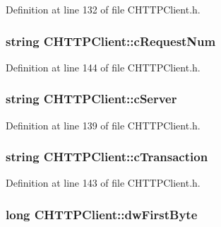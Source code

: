 \-Definition at line 132 of file \-C\-H\-T\-T\-P\-Client.\-h.

\hypertarget{class_c_h_t_t_p_client_aa4092d7fea50e76e30f3269479253db6}{
\subsubsection[{c\-Request\-Num}]{\setlength{\rightskip}{0pt plus 5cm}string {\bf \-C\-H\-T\-T\-P\-Client\-::c\-Request\-Num}}}\label{class_c_h_t_t_p_client_aa4092d7fea50e76e30f3269479253db6}


\-Definition at line 144 of file \-C\-H\-T\-T\-P\-Client.\-h.

\hypertarget{class_c_h_t_t_p_client_acbcb5dd8619fbba37910ca522a0bc1a4}{
\subsubsection[{c\-Server}]{\setlength{\rightskip}{0pt plus 5cm}string {\bf \-C\-H\-T\-T\-P\-Client\-::c\-Server}}}\label{class_c_h_t_t_p_client_acbcb5dd8619fbba37910ca522a0bc1a4}


\-Definition at line 139 of file \-C\-H\-T\-T\-P\-Client.\-h.

\hypertarget{class_c_h_t_t_p_client_adbc5e3e3b321c3179b986f2ed2ff0eb1}{
\subsubsection[{c\-Transaction}]{\setlength{\rightskip}{0pt plus 5cm}string {\bf \-C\-H\-T\-T\-P\-Client\-::c\-Transaction}}}\label{class_c_h_t_t_p_client_adbc5e3e3b321c3179b986f2ed2ff0eb1}


\-Definition at line 143 of file \-C\-H\-T\-T\-P\-Client.\-h.

\hypertarget{class_c_h_t_t_p_client_a88849e78a493edc3c349f3ada5ee86c2}{
\subsubsection[{dw\-First\-Byte}]{\setlength{\rightskip}{0pt plus 5cm}long {\bf \-C\-H\-T\-T\-P\-Client\-::dw\-First\-Byte}}}\label{class_c_h_t_t_p_client_a88849e78a493edc3c349f3ada5ee86c2}


